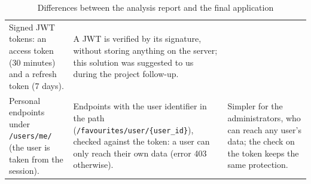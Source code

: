 \begin{table}[H]
\begin{tabularx}{\textwidth}{@{}>{\raggedright\arraybackslash}X>{\raggedright\arraybackslash}X>{\raggedright\arraybackslash}X@{}}
    Signed JWT tokens: an access token (30 minutes) and a refresh token (7 days). &
    A JWT is verified by its signature, without storing anything on the server; this solution
      was suggested to us during the project follow-up. \\
    \addlinespace
    Personal endpoints under \texttt{/users/me/} (the user is taken from the session). &
    Endpoints with the user identifier in the path (\texttt{/favourites/user/\{user\_id\}}), checked
      against the token: a user can only reach their own data (error 403 otherwise). &
    Simpler for the administrators, who can reach any user's data; the check on the token keeps
      the same protection. \\
    \bottomrule
  \end{tabularx}
  \caption{Differences between the analysis report and the final application}
  \label{tab:changes}
\end{table}
